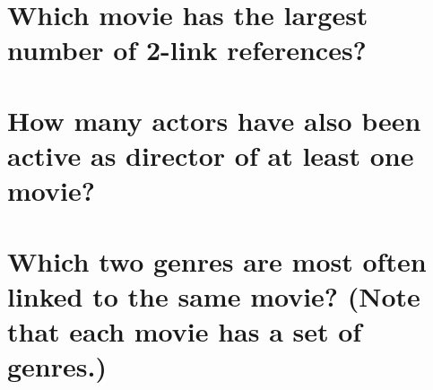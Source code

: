 \documentclass[a4paper,11pt]{memoir}
\begin{document}
\section{Which movie has the largest number of 2-link references?}



\section{How many actors have also been active as director of at least one movie?}




\section{Which two genres are most often linked to the same movie? (Note that each movie has a set of genres.)}


\end{document}
